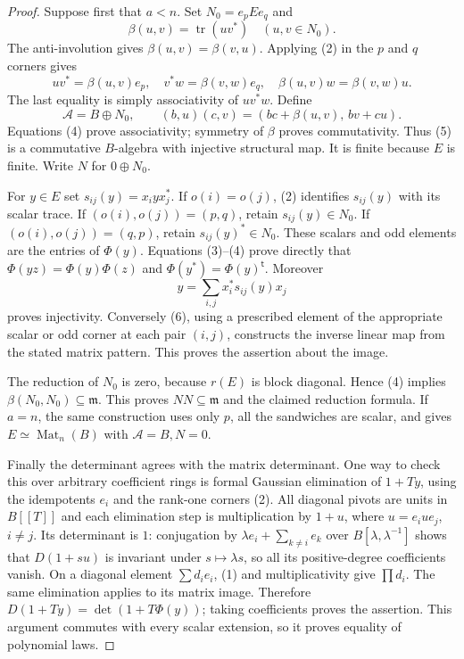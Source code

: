 \begin{proof}
Suppose first that $a<n$.  Set $N_0=e_pEe_q$ and
\[
               \beta(u,v)=\operatorname{tr}(uv^*)
               \quad(u,v\in N_0).
\]
The anti-involution gives $\beta(u,v)=\beta(v,u)$.
Applying (2) in the $p$ and $q$ corners gives
\[
 uv^*=\beta(u,v)e_p,\quad
 v^*w=\beta(v,w)e_q,\quad
 \beta(u,v)w=\beta(v,w)u.                         \tag{4}
\]
The last equality is simply associativity of $uv^*w$.
Define
\[
 \mathcal A=B\oplus N_0,\qquad
 (b,u)(c,v)=(bc+\beta(u,v),\,bv+cu).              \tag{5}
\]
Equations (4) prove associativity; symmetry of $\beta$ proves
commutativity.  Thus (5) is a commutative $B$-algebra with injective
structural map.  It is finite because $E$ is finite.  Write $N$ for
$0\oplus N_0$.

For $y\in E$ set $s_{ij}(y)=x_i yx_j^*$.
If $o(i)=o(j)$, (2) identifies $s_{ij}(y)$ with its scalar trace.
If $(o(i),o(j))=(p,q)$, retain $s_{ij}(y)\in N_0$.
If $(o(i),o(j))=(q,p)$, retain $s_{ij}(y)^*\in N_0$.
These scalars and odd elements are the entries of $\Phi(y)$.
Equations (3)--(4) prove directly that
$\Phi(yz)=\Phi(y)\Phi(z)$ and
$\Phi(y^*)=\Phi(y)^{\mathsf t}$.
Moreover
\[
                  y=\sum_{i,j}x_i^*s_{ij}(y)x_j                \tag{6}
\]
proves injectivity.  Conversely (6), using a prescribed element of
the appropriate scalar or odd corner at each pair $(i,j)$,
constructs the inverse linear map from the stated matrix pattern.
This proves the assertion about the image.

The reduction of $N_0$ is zero, because $r(E)$ is block diagonal.
Hence (4) implies $\beta(N_0,N_0)\subseteq\mathfrak m$.
This proves $NN\subseteq\mathfrak m$ and the claimed reduction
formula.  If $a=n$, the same construction uses only $p$, all the
sandwiches are scalar, and gives $E\simeq\operatorname{Mat}_n(B)$
with $\mathcal A=B,N=0$.

Finally the determinant agrees with the matrix determinant.  One
way to check this over arbitrary coefficient rings is formal
Gaussian elimination of $1+Ty$, using the idempotents $e_i$ and
the rank-one corners (2).  All diagonal pivots are units in
$B[[T]]$ and each elimination step is multiplication by $1+u$,
where $u=e_iue_j$, $i\ne j$.  Its determinant is $1$:
conjugation by
$\lambda e_i+\sum_{k\ne i}e_k$ over
$B[\lambda,\lambda^{-1}]$ shows that $D(1+su)$ is invariant under
$s\mapsto\lambda s$, so all its positive-degree coefficients
vanish.  On a diagonal element $\sum d_i e_i$, (1) and
multiplicativity give $\prod d_i$.  The same elimination applies
to its matrix image.  Therefore
$D(1+Ty)=\det(1+T\Phi(y))$; taking coefficients proves the
assertion.  This argument commutes with every scalar extension,
so it proves equality of polynomial laws.
\end{proof}

